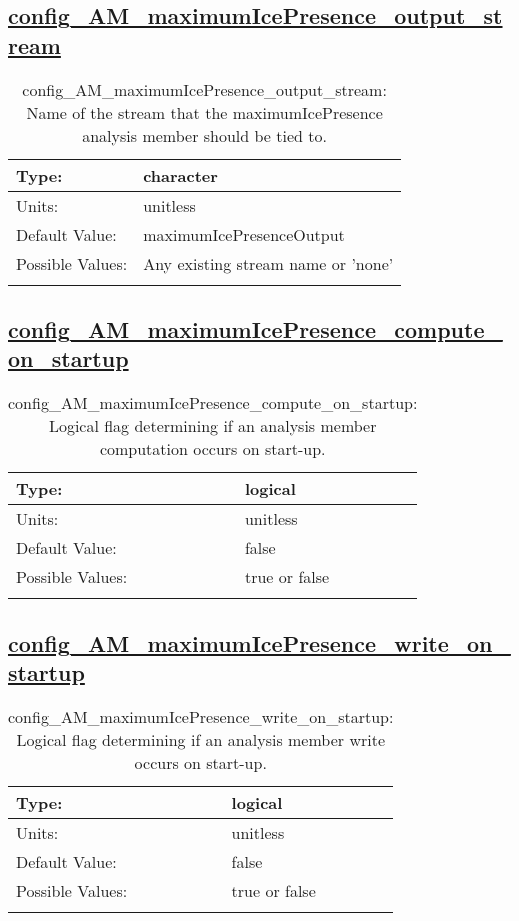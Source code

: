 \subsection[config\_AM\_maximumIcePresence\_output\_stream]{\hyperref[sec:nm_tab_AM_maximumIcePresence]{config\_AM\_maximumIcePresence\_output\_stream}}
\label{subsec:nm_sec_config_AM_maximumIcePresence_output_stream}
\begin{center}
\begin{longtable}{| p{2.0in} || p{4.0in} |}
    \hline
    Type: & character \\
    \hline
    Units: & \si{unitless} \\
    \hline
    Default Value: & maximumIcePresenceOutput \\
    \hline
    Possible Values: & Any existing stream name or 'none' \\
    \hline
    \caption{config\_AM\_maximumIcePresence\_output\_stream: Name of the stream that the maximumIcePresence analysis member should be tied to.}
\end{longtable}
\end{center}
\subsection[config\_AM\_maximumIcePresence\_compute\_on\_startup]{\hyperref[sec:nm_tab_AM_maximumIcePresence]{config\_AM\_maximumIcePresence\_compute\_on\_startup}}
\label{subsec:nm_sec_config_AM_maximumIcePresence_compute_on_startup}
\begin{center}
\begin{longtable}{| p{2.0in} || p{4.0in} |}
    \hline
    Type: & logical \\
    \hline
    Units: & \si{unitless} \\
    \hline
    Default Value: & false \\
    \hline
    Possible Values: & true or false \\
    \hline
    \caption{config\_AM\_maximumIcePresence\_compute\_on\_startup: Logical flag determining if an analysis member computation occurs on start-up.}
\end{longtable}
\end{center}
\subsection[config\_AM\_maximumIcePresence\_write\_on\_startup]{\hyperref[sec:nm_tab_AM_maximumIcePresence]{config\_AM\_maximumIcePresence\_write\_on\_startup}}
\label{subsec:nm_sec_config_AM_maximumIcePresence_write_on_startup}
\begin{center}
\begin{longtable}{| p{2.0in} || p{4.0in} |}
    \hline
    Type: & logical \\
    \hline
    Units: & \si{unitless} \\
    \hline
    Default Value: & false \\
    \hline
    Possible Values: & true or false \\
    \hline
    \caption{config\_AM\_maximumIcePresence\_write\_on\_startup: Logical flag determining if an analysis member write occurs on start-up.}
\end{longtable}
\end{center}
